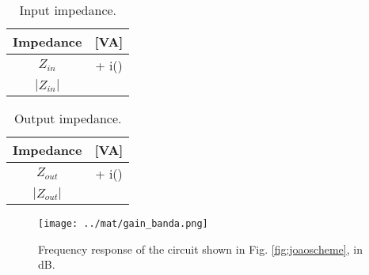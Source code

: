 \begin{table}[H]
    \centering
    \begin{tabular}{|c|c|}
    	\hline
        Impedance &  [VA]\\ 
        \hline
        $Z_{in}$ &  + i()\\ \hline
        $|Z_{in}|$ & \\ \hline
    \end{tabular}
    \caption{Input impedance.}
    \label{tab:octinput}
\end{table}

\begin{table}[H]
    \centering
    \begin{tabular}{|c|c|}
    	\hline
        Impedance &  [VA]\\ 
        \hline
        $Z_{out}$ &  + i()\\ \hline
        $|Z_{out}|$ & \\ \hline
    \end{tabular}
    \caption{Output impedance.}
    \label{tab:octoutput}
\end{table}

\begin{figure}[H]
    \centering
    \texttt{[image: ../mat/gain\_banda.png]}
    \caption{Frequency response of the circuit shown in Fig. \ref{fig:joaoscheme}, in dB.}
    \label{fig:octavefreq}
\end{figure}